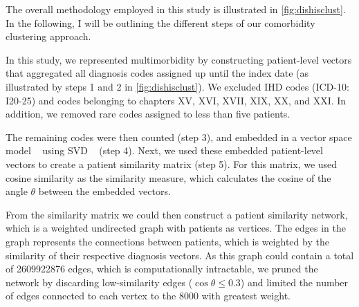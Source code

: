 The overall methodology employed in this study is illustrated 
in \cref{fig:dishisclust}. In the following, I will be outlining the 
different steps of our comorbidity clustering approach. 

In this study, we represented multimorbidity by constructing patient-level
vectors that aggregated all diagnosis codes assigned up until the index date 
(as illustrated by steps 1 and 2 in \cref{fig:dishisclust}).
We excluded \ac{IHD} codes (\ac{ICD-10}: I20-25) and
codes belonging to chapters XV, XVI, XVII, XIX, XX, and XXI.%
In addition, we removed rare codes assigned to less than five patients.

The remaining codes were then counted (step 3), 
and embedded in a vector space model 
~\autocite{saltonVector1975}
using \ac{SVD}
~\autocite{golubSingular1971} (step 4).
Next, we used these embedded patient-level vectors 
to create a patient similarity matrix (step 5). 
For this matrix, we used cosine similarity as the similarity measure,
which calculates the cosine of the angle \(\theta\) 
between the embedded vectors.

From the similarity matrix we could then 
construct a patient similarity network,
which is a weighted undirected graph with 
patients as vertices. 
The edges in the graph represents the connections between patients,
which is weighted by the similarity of their respective diagnosis vectors.
As this graph could contain a total of
\num{2609922876} edges, which is computationally intractable, 
we pruned the network by discarding low-similarity edges 
(\(\cos{\theta} \leq 0.3\)) and limited the number of edges
connected to each vertex to the \num{8000} with greatest weight.

